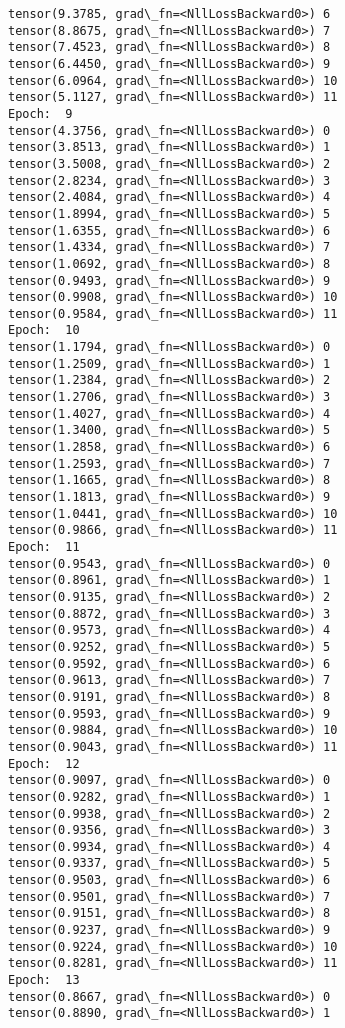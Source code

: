 \documentclass[11pt]{article}
\begin{document}
\begin{Verbatim}[commandchars=\\\{\}]
tensor(9.3785, grad\_fn=<NllLossBackward0>) 6
tensor(8.8675, grad\_fn=<NllLossBackward0>) 7
tensor(7.4523, grad\_fn=<NllLossBackward0>) 8
tensor(6.4450, grad\_fn=<NllLossBackward0>) 9
tensor(6.0964, grad\_fn=<NllLossBackward0>) 10
tensor(5.1127, grad\_fn=<NllLossBackward0>) 11
Epoch:  9
tensor(4.3756, grad\_fn=<NllLossBackward0>) 0
tensor(3.8513, grad\_fn=<NllLossBackward0>) 1
tensor(3.5008, grad\_fn=<NllLossBackward0>) 2
tensor(2.8234, grad\_fn=<NllLossBackward0>) 3
tensor(2.4084, grad\_fn=<NllLossBackward0>) 4
tensor(1.8994, grad\_fn=<NllLossBackward0>) 5
tensor(1.6355, grad\_fn=<NllLossBackward0>) 6
tensor(1.4334, grad\_fn=<NllLossBackward0>) 7
tensor(1.0692, grad\_fn=<NllLossBackward0>) 8
tensor(0.9493, grad\_fn=<NllLossBackward0>) 9
tensor(0.9908, grad\_fn=<NllLossBackward0>) 10
tensor(0.9584, grad\_fn=<NllLossBackward0>) 11
Epoch:  10
tensor(1.1794, grad\_fn=<NllLossBackward0>) 0
tensor(1.2509, grad\_fn=<NllLossBackward0>) 1
tensor(1.2384, grad\_fn=<NllLossBackward0>) 2
tensor(1.2706, grad\_fn=<NllLossBackward0>) 3
tensor(1.4027, grad\_fn=<NllLossBackward0>) 4
tensor(1.3400, grad\_fn=<NllLossBackward0>) 5
tensor(1.2858, grad\_fn=<NllLossBackward0>) 6
tensor(1.2593, grad\_fn=<NllLossBackward0>) 7
tensor(1.1665, grad\_fn=<NllLossBackward0>) 8
tensor(1.1813, grad\_fn=<NllLossBackward0>) 9
tensor(1.0441, grad\_fn=<NllLossBackward0>) 10
tensor(0.9866, grad\_fn=<NllLossBackward0>) 11
Epoch:  11
tensor(0.9543, grad\_fn=<NllLossBackward0>) 0
tensor(0.8961, grad\_fn=<NllLossBackward0>) 1
tensor(0.9135, grad\_fn=<NllLossBackward0>) 2
tensor(0.8872, grad\_fn=<NllLossBackward0>) 3
tensor(0.9573, grad\_fn=<NllLossBackward0>) 4
tensor(0.9252, grad\_fn=<NllLossBackward0>) 5
tensor(0.9592, grad\_fn=<NllLossBackward0>) 6
tensor(0.9613, grad\_fn=<NllLossBackward0>) 7
tensor(0.9191, grad\_fn=<NllLossBackward0>) 8
tensor(0.9593, grad\_fn=<NllLossBackward0>) 9
tensor(0.9884, grad\_fn=<NllLossBackward0>) 10
tensor(0.9043, grad\_fn=<NllLossBackward0>) 11
Epoch:  12
tensor(0.9097, grad\_fn=<NllLossBackward0>) 0
tensor(0.9282, grad\_fn=<NllLossBackward0>) 1
tensor(0.9938, grad\_fn=<NllLossBackward0>) 2
tensor(0.9356, grad\_fn=<NllLossBackward0>) 3
tensor(0.9934, grad\_fn=<NllLossBackward0>) 4
tensor(0.9337, grad\_fn=<NllLossBackward0>) 5
tensor(0.9503, grad\_fn=<NllLossBackward0>) 6
tensor(0.9501, grad\_fn=<NllLossBackward0>) 7
tensor(0.9151, grad\_fn=<NllLossBackward0>) 8
tensor(0.9237, grad\_fn=<NllLossBackward0>) 9
tensor(0.9224, grad\_fn=<NllLossBackward0>) 10
tensor(0.8281, grad\_fn=<NllLossBackward0>) 11
Epoch:  13
tensor(0.8667, grad\_fn=<NllLossBackward0>) 0
tensor(0.8890, grad\_fn=<NllLossBackward0>) 1

\end{Verbatim}
\end{document}
